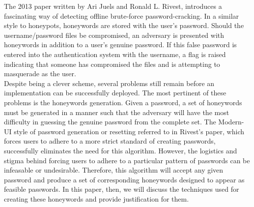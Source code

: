 The 2013 paper written by Ari Juels and Ronald L. Rivest, introduces a fascinating way of detecting offline brute-force password-cracking. In a similar style to honeypots, honeywords are stored with the user's password. Should the username/password files be compromised, an adversary is presented with honeywords in addition to a user's genuine password. If this false password is entered into the authentication system with the username, a flag is raised indicating that someone has compromised the files and is attempting to masquerade as the user. \\

Despite being a clever scheme, several problems still remain before an implementation can be successfully deployed. The most pertinent of these problems is the honeywords generation. Given a password, a set of honeywords must be generated in a manner such that the adversary will have the most difficulty in guessing the genuine password from the complete set. The Modern-UI style of password generation or resetting referred to in Rivest's paper, which forces users to adhere to a more strict standard of creating passwords, successfully eliminates the need for this algorithm. However, the logistics and stigma behind forcing users to adhere to a particular pattern of passwords can be infeasable or undesirable. Therefore, this algorithm will accept any given password and produce a set of corresponding honeywords designed to appear as feasible passwords. In this paper, then, we will discuss the techniques used for creating these honeywords and provide justification for them.\\



